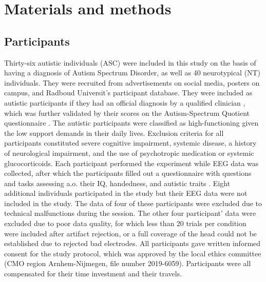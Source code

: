\section*{Materials and methods}

\subsection*{Participants}
Thirty-six autistic individuals (ASC) were included in this study on the basis of having a diagnosis of Autism Spectrum Disorder, as well as 40 neurotypical (NT) individuals. They were recruited from advertisements on social media, posters on campus, and Radboud Universit's participant database. They were included as autistic participants if they had an official diagnosis by a qualified clinician \citep{apa2013}, which was further validated by their scores on the Autism-Spectrum Quotient questionnaire \citep[AQ]{baron-cohen2001AQ}. The autistic participants were classified as high-functioning given the low support demands in their daily lives. Exclusion criteria for all participants constituted severe cognitive impairment, systemic disease, a history of neurological impairment, and the use of psychotropic medication or systemic glucocorticoids. Each participant performed the experiment while EEG data was collected, after which the participants filled out a questionnaire with questions and tasks assessing a.o. their IQ, handedness, and autistic traits \citep{baron-cohen2001AQ,raven1989,veale2014}. Eight additional individuals participated in the study but their EEG data were not included in the study. The data of four of these participants were excluded due to technical malfunctions during the session. The other four participant' data were excluded due to poor data quality, for which less than 20 trials per condition were included after artifact rejection, or a full coverage of the head could not be established due to rejected bad electrodes. All participants gave written informed consent for the study protocol, which was approved by the local ethics committee (CMO region Arnhem-Nijmegen, file number 2019-6059). Participants were all compensated for their time investment and their travels.

